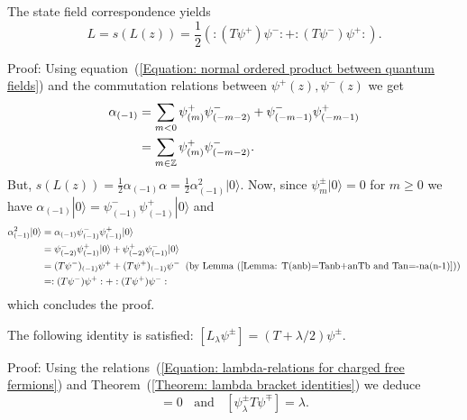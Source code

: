 \begin{dang}
    \begin{lemma}\label{Equation: State field for L}
        The state field correspondence yields 
        \begin{equation}
           L= s(L(z))=\frac{1}{2}(:(T\psi^+)\psi^-:+:(T\psi^-)\psi^+:).
        \end{equation}
    \end{lemma}
\end{dang}
Proof: Using equation~(\ref{Equation: normal ordered product between quantum fields}) and the commutation relations between $\psi^+(z), \psi^-(z)$ we get
\begin{equation}
\begin{split}
    \alpha_{(-1)}&=\sum_{m<0}\psi^+_{(m)}\psi^-_{(-m-2)}+\psi^-_{(-m-1)}\psi^+_{(-m-1)}\\
    &=\sum_{m\in\mathbb{Z}}\psi^+_{(m)}\psi^-_{(-m-2)}.
\end{split}
\end{equation}
But, $s(L(z))=\frac{1}{2}\alpha_{(-1)}\alpha=\frac{1}{2}\alpha_{(-1)}^2|0\rangle$. Now, since $\psi^\pm_{m}|0\rangle=0$ for $m\geq0$ we have $\alpha_{(-1)}|0\rangle=\psi^-_{(-1)}\psi^+_{(-1)}|0\rangle$ and 
\begin{equation}
\begin{split}
     \alpha_{(-1)}^2|0\rangle&=\alpha_{(-1)}\psi^-_{(-1)}\psi^+_{(-1)}|0\rangle\\
    &=\psi_{(-2)}^-\psi_{(-1)}^+|0\rangle+\psi^+_{(-2)}\psi^-_{(-1)}|0\rangle\\
    &=(T\psi^-)_{(-1)}\psi^++(T\psi^+)_{(-1)}\psi^-\;\;(\text{by Lemma~(\ref{Lemma: T(anb)=Tanb+anTb and Tan=-na(n-1)})})\\
    &=:(T\psi^-)\psi^+:+:(T\psi^+)\psi^-:
\end{split}
\end{equation}
which concludes the proof.
\begin{dang}
    \begin{lemma}\label{Lemma: action of L on psi}
        The following identity is satisfied: $[L_\lambda\psi^\pm]=(T+\lambda/2)\psi^\pm$.
    \end{lemma}
\end{dang}
Proof: Using the relations~(\ref{Equation: lambda-relations for charged free fermions}) and Theorem~(\ref{Theorem: lambda bracket identities}) we deduce
\begin{equation}
    [\psi^\pm_\lambda T\psi^\pm]=0\;\;\text{ and }\;\;[\psi^\pm_\lambda T\psi^\mp]=\lambda.
\end{equation}
